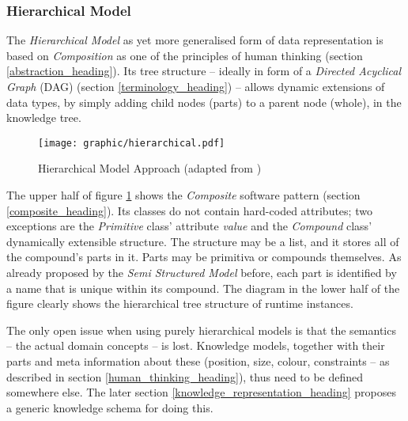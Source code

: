 %
%
%
%
%
%
%

\subsubsection{Hierarchical Model}
\label{hierarchical_model_heading}

The \emph{Hierarchical Model} as yet more generalised form of data representation
is based on \emph{Composition} as one of the principles of human thinking
(section \ref{abstraction_heading}). Its tree structure -- ideally in form of a
\emph{Directed Acyclical Graph} (DAG) (section \ref{terminology_heading}) --
allows dynamic extensions of data types, by simply adding child nodes (parts)
to a parent node (whole), in the knowledge tree.

\begin{figure}[ht]
    \begin{center}
        \texttt{[image: graphic/hierarchical.pdf]}
        \caption{Hierarchical Model Approach (adapted from \cite{archetypes})}
        \label{hierarchical_figure}
    \end{center}
\end{figure}

The upper half of figure \ref{hierarchical_figure} shows the \emph{Composite}
software pattern (section \ref{composite_heading}). Its classes do not contain
hard-coded attributes; two exceptions are the \emph{Primitive} class' attribute
\emph{value} and the \emph{Compound} class' dynamically extensible structure.
The structure may be a list, and it stores all of the compound's parts in it.
Parts may be primitiva or compounds themselves. As already proposed by the
\emph{Semi Structured Model} before, each part is identified by a name that is
unique within its compound. The diagram in the lower half of the figure clearly
shows the hierarchical tree structure of runtime instances.

The only open issue when using purely hierarchical models is that the semantics
-- the actual domain concepts -- is lost. Knowledge models, together with their
parts and meta information about these (position, size, colour, constraints --
as described in section \ref{human_thinking_heading}), thus need to be defined
somewhere else. The later section \ref{knowledge_representation_heading}
proposes a generic knowledge schema for doing this.
